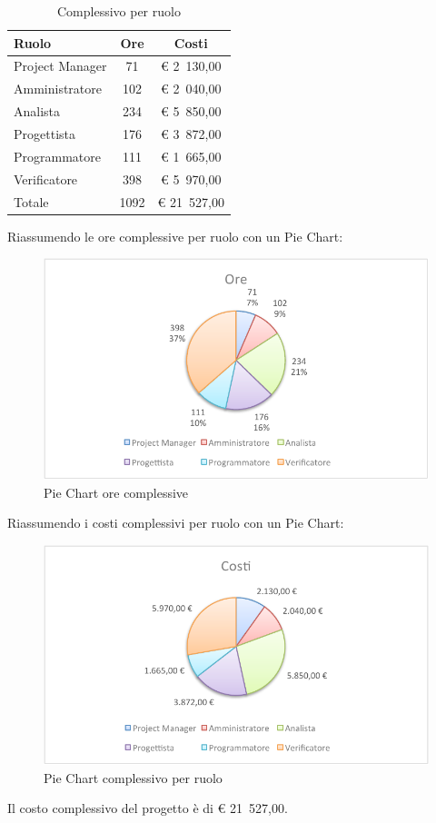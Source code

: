 				\begin{table}[H]
					\begin{center}
						\begin{tabular}{| l | c | c |}
							\hline
							Ruolo 				& Ore 	& Costi  \\ \hline
							
							Project Manager		& 71 	& \euro{} 2~130,00 	\\
							Amministratore 		& 102 	& \euro{} 2~040,00 	\\
							Analista	 		& 234 	& \euro{} 5~850,00 	\\
							Progettista 		& 176	& \euro{} 3~872,00 	\\
							Programmatore		& 111	& \euro{} 1~665,00	\\
							Verificatore		& 398 	& \euro{} 5~970,00 	\\ \hline \hline
							
							Totale	 			& 1092 	& \euro{} 21~527,00 	\\ \hline
						\end{tabular}
					\end{center}
					\caption{Complessivo per ruolo}
				\end{table}
				Riassumendo le ore complessive per ruolo con un Pie Chart:
				\begin{figure}[H]\centering
					\includegraphics[width=\textwidth]{PianoDiProgetto/Pics/ChartTotOre.pdf}
					\caption{Pie Chart ore complessive}
				\end{figure}
				Riassumendo i costi complessivi per ruolo con un Pie Chart:
				\begin{figure}[H]\centering
					\includegraphics[width=\textwidth]{PianoDiProgetto/Pics/ChartTotCosti.pdf}
					\caption{Pie Chart complessivo per ruolo}
				\end{figure}
				Il costo complessivo del progetto è di \euro{} 21~527,00.
